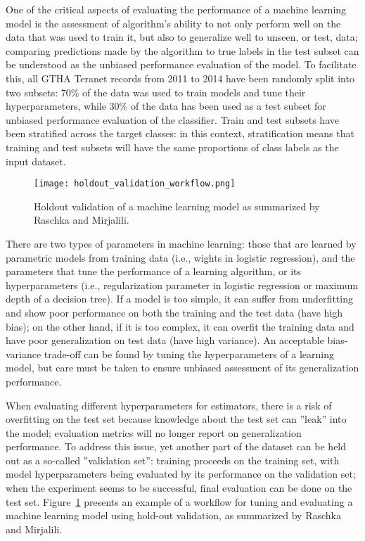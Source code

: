 One of the critical aspects of evaluating the performance of a machine learning model is the assessment of algorithm's ability to not only perform well on the data that was used to train it, but also to generalize well to unseen, or test, data;
comparing predictions made by the algorithm to true labels in the test subset can be understood as the unbiased performance evaluation of the model\cite{RaschkaMirjalili2017}.
To facilitate this, all GTHA Teranet records from 2011 to 2014 have been randomly split into two subsets: 70\% of the data was used to train models and tune their hyperparameters, while 30\% of the data has been used as a test subset for unbiased performance evaluation of the classifier.
Train and test subsets have been stratified across the target classes:
in this context, stratification means that training and test subsets will have the same proportions of class labels as the input dataset.

\begin{figure}[hbt!]
    \centering
    \texttt{[image: holdout\_validation\_workflow.png]}
    \caption{Holdout validation of a machine learning model as summarized by Raschka and Mirjalili\cite{RaschkaMirjalili2017}.}
    \label{fig:holdout_validation_workflow}
\end{figure}

There are two types of parameters in machine learning: those that are learned by parametric models from training data (i.e., wights in logistic regression), and the parameters that tune the performance of a learning algorithm, or its hyperparameters (i.e., regularization parameter in logistic regression or maximum depth of a decision tree).
If a model is too simple, it can suffer from underfitting and show poor performance on both the training and the test data (have high bias);
on the other hand, if it is too complex, it can overfit the training data and have poor generalization on test data (have high variance).
An acceptable bias-variance trade-off can be found by tuning the hyperparameters of a learning model, but care must be taken to ensure unbiased assessment of its generalization performance.

When evaluating different hyperparameters for estimators, there is a risk of overfitting on the test set because knowledge about the test set can ''leak'' into the model;
evaluation metrics will no longer report on generalization performance.
To address this issue, yet another part of the dataset can be held out as a so-called ''validation set'': training proceeds on the training set, with model hyperparameters being evaluated by its performance on the validation set;
when the experiment seems to be successful, final evaluation can be done on the test set.
Figure~\ref{fig:holdout_validation_workflow} presents an example of a workflow for tuning and evaluating a machine learning model using hold-out validation, as summarized by Raschka and Mirjalili\cite{RaschkaMirjalili2017}.

